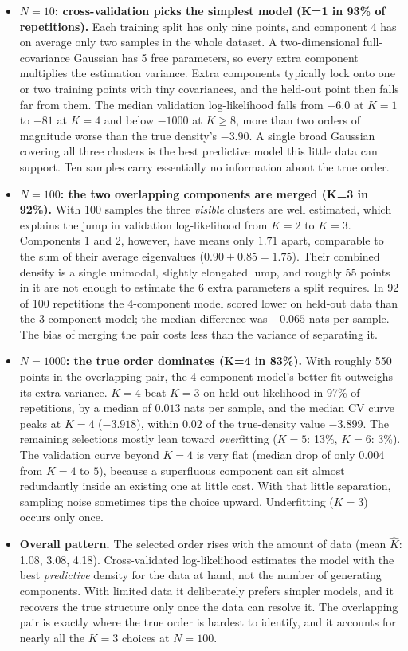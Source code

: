 \begin{itemize}
\item \textbf{$N=10$: cross-validation picks the simplest model (K=1 in 93\% of repetitions).} Each training split has only nine points, and component 4 has on average only two samples in the whole dataset. A two-dimensional full-covariance Gaussian has 5 free parameters, so every extra component multiplies the estimation variance. Extra components typically lock onto one or two training points with tiny covariances, and the held-out point then falls far from them. The median validation log-likelihood falls from $-6.0$ at $K=1$ to $-81$ at $K=4$ and below $-1000$ at $K\ge8$, more than two orders of magnitude worse than the true density's $-3.90$. A single broad Gaussian covering all three clusters is the best predictive model this little data can support. Ten samples carry essentially no information about the true order.
\item \textbf{$N=100$: the two overlapping components are merged (K=3 in 92\%).} With 100 samples the three \emph{visible} clusters are well estimated, which explains the jump in validation log-likelihood from $K=2$ to $K=3$. Components 1 and 2, however, have means only $1.71$ apart, comparable to the sum of their average eigenvalues ($0.90+0.85=1.75$). Their combined density is a single unimodal, slightly elongated lump, and roughly 55 points in it are not enough to estimate the 6 extra parameters a split requires. In 92 of 100 repetitions the 4-component model scored lower on held-out data than the 3-component model; the median difference was $-0.065$ nats per sample. The bias of merging the pair costs less than the variance of separating it.
\item \textbf{$N=1000$: the true order dominates (K=4 in 83\%).} With roughly 550 points in the overlapping pair, the 4-component model's better fit outweighs its extra variance. $K=4$ beat $K=3$ on held-out likelihood in 97\% of repetitions, by a median of $0.013$ nats per sample, and the median CV curve peaks at $K=4$ ($-3.918$), within $0.02$ of the true-density value $-3.899$. The remaining selections mostly lean toward \emph{over}fitting ($K=5$: 13\%, $K=6$: 3\%). The validation curve beyond $K=4$ is very flat (median drop of only $0.004$ from $K=4$ to $5$), because a superfluous component can sit almost redundantly inside an existing one at little cost. With that little separation, sampling noise sometimes tips the choice upward. Underfitting ($K=3$) occurs only once.
\item \textbf{Overall pattern.} The selected order rises with the amount of data (mean $\hat K$: 1.08, 3.08, 4.18). Cross-validated log-likelihood estimates the model with the best \emph{predictive} density for the data at hand, not the number of generating components. With limited data it deliberately prefers simpler models, and it recovers the true structure only once the data can resolve it. The overlapping pair is exactly where the true order is hardest to identify, and it accounts for nearly all the $K=3$ choices at $N=100$.

\end{itemize}
